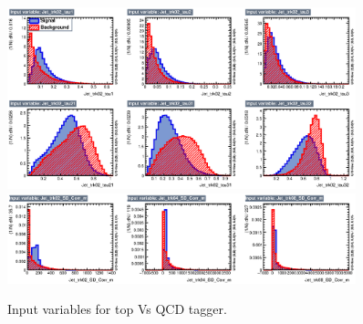 \documentclass{cernrep}
\begin{document}
\begin{figure}[!htb]\centering
\includegraphics[width=0.9\textwidth]{Fig/TMVA/thad_vs_QCD/variables_id_c1.eps}
\includegraphics[width=0.9\textwidth,trim={0 5cm 0 0},clip]{Fig/TMVA/thad_vs_QCD/variables_id_c2.eps}
\caption{Input variables for top Vs QCD tagger.}
\label{fig:TMVA_inputs_t}
\end{figure}
\end{document}
